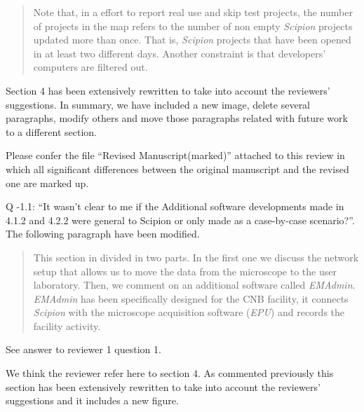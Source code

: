 \documentclass[a4paper,12pt]{article}
\def\cnb{CNB\xspace}
\def\scipion{\textit{Scipion}\xspace}
\def\emadmin{\textit{EMAdmin}\xspace}
\def\epu{\textit{EPU}\xspace}
\def\cnb{CNB\xspace}
\begin{document}
\begin{reviewer}
\begin{quote}
Note that, in a effort to report real use and skip test projects, the number of projects in the map refers to the number of non empty \scipion projects updated more than once. That is, 
\scipion projects that have been opened in at least two different days. Another constraint is that developers' computers are filtered out.
\end{quote}



\reply Section 4 has been extensively rewritten to take into account the reviewers' suggestions. In summary, we have included a new image, delete several paragraphs, modify others and move those paragraphs related with future work to a different section.

Please confer the file ``Revised Manuscript(marked)'' attached to this review in which 
all significant differences between the original manuscript and the revised one are marked up.

Q \the\numexpr\value{pointcounter}-1\relax.1: ``It wasn't clear to me if the Additional software developments made in 4.1.2 and 4.2.2 were general to Scipion or only made as a case-by-case scenario?''. The following paragraph have been modified.

\begin{quote}
 This section in divided in two parts. In the first one we discuss the network setup that allows us to move the data from the microscope to the user laboratory. Then,  we comment on an additional software called  \emadmin. \emadmin has been specifically designed for the \cnb facility, it connects \scipion with the microscope acquisition software (\epu) and records the facility activity.
\end{quote}



\reply See answer to reviewer 1 question 1. 


\reply We think the reviewer refer here to section 4. As commented previously this section has been extensively rewritten to take into account the reviewers' suggestions and it includes a new figure.

\end{reviewer}
\end{document}

